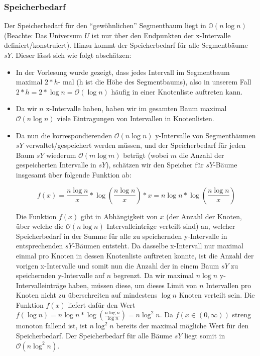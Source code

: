 \documentclass[a4paper]{article}
\begin{document}
\subsubsection*{Speicherbedarf}
Der Speicherbedarf für den "`gewöhnlichen"' Segmentbaum liegt  in $\mathbb{O}(n \log n)$ (Beachte: Das Universum $U$ ist nur über den Endpunkten der x-Intervalle
definiert/konstruiert). Hinzu kommt der Speicherbedarf für alle Segmentbäume $sY$.
Dieser lässt sich wie folgt abschätzen:

\begin{itemize}
	\item In der Vorlesung wurde gezeigt, dass jedes Intervall im Segmentbaum maximal $2 * h$- mal (h ist die Höhe des Segmentbaums), also in unserem Fall $2 * h = 2 * \log n 
	= \mathcal{O}(\log n)$ häufig in einer Knotenliste auftreten kann.
	\item Da wir $n$ x-Intervalle haben, haben wir im gesamten Baum maximal $\mathcal{O}(n \log n)$ viele
	Eintragungen von Intervallen in Knotenlisten.
	\item Da nun die korrespondierenden $\mathcal{O}(n \log n)$ y-Intervalle von Segmentbäumen $sY$ verwaltet/gespeichert werden 	
	müssen, und der Speicherbedarf für jeden Baum $sY$ wiederum $\mathcal{O}(m \log m)$ beträgt (wobei $m$
	die Anzahl der gespeicherten Intervalle in $sY$), schätzen wir den Speicher für $sY$-Bäume insgesamt über folgende 
	Funktion ab:
	
	$$f(x) = \frac{n \log n}{x} * \log(\frac{n \log n}{x}) * x = n \log n * \log(\frac{n \log n}{x})$$
	
	Die Funktion $f(x)$ gibt in Abhängigkeit von $x$ (der Anzahl der Knoten, über welche die $\mathcal{O}(n \log n)$ Intervalleinträge verteilt sind) an, welcher Speicherbedarf in der Summe für alle zu speichernden
	y-Intervalle in entsprechenden $sY$-Bäumen entsteht. Da dasselbe x-Intervall nur maximal einmal
	pro Knoten in dessen Knotenliste auftreten konnte, ist die Anzahl der vorigen x-Intervalle und somit nun die Anzahl der in einem Baum $sY$ zu speichernden y-Intervalle auf $n$ begrenzt. Da wir maximal $n \log n$ y-Intervalleinträge haben, müssen diese, um 
	dieses Limit von $n$ Intervallen pro Knoten nicht zu überschreiten auf mindestens $\log n$ Knoten verteilt sein. Die Funktion $f(x)$ liefert dafür den Wert $f(\log n) = n \log n * \log(\frac{n \log n}{\log n}) =
	n \log^2 n$. Da $f(x \in (0, \infty))$ streng monoton fallend ist, ist $n \log^2 n$ bereits der 
	maximal mögliche Wert für den Speicherbedarf. Der Speicherbedarf für alle Bäume $sY$ liegt somit
	in $\mathcal{O}( n \log^2 n)$.
	
\end{itemize}
\end{document}

